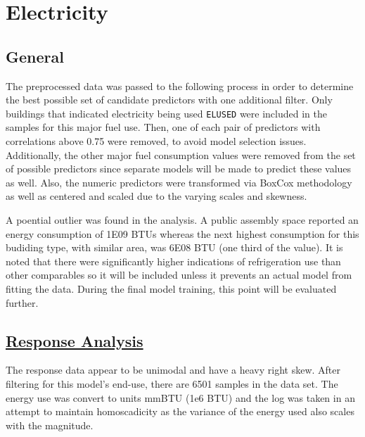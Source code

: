 \section*{Electricity}
\label{sec:electricity}

\subsection{General}

The preprocessed data was passed to the following process in order to determine the best possible set of candidate predictors with one additional filter.  Only buildings that indicated electricity being used \lstinline{ELUSED} were included in the samples for this major fuel use.  Then, one of each pair of predictors with correlations above 0.75 were removed, to avoid model selection issues. Additionally, the other major fuel consumption values were removed from the set of possible predictors since separate models will be made to predict these values as well.  Also, the numeric predictors were transformed via BoxCox methodology as well as centered and scaled due to the varying scales and skewness.

A poential outlier was found in the analysis. A public assembly space reported an energy consumption of 1E09 BTUs whereas the next highest consumption for this budiding type, with similar area, was  6E08 BTU (one third of the value).  It is noted that there were significantly higher indications of refrigeration use than other comparables so it will be included unless it prevents an actual model from fitting the data.  During the final model training, this point will be evaluated further.

\subsection{\hyperref[appendix:electricity:response]{Response Analysis}}

The response data appear to be unimodal and have a heavy right skew.  After filtering for this model's end-use, there are 6501 samples in the data set.  The energy use was convert to units mmBTU (1e6 BTU) and the log was taken in an attempt to maintain homoscadicity as the variance of the energy used also scales with the magnitude.

